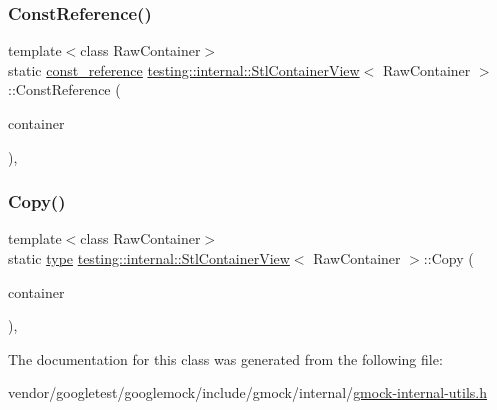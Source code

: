 \subsubsection{\texorpdfstring{Const\+Reference()}{ConstReference()}}
{\footnotesize\ttfamily template$<$class Raw\+Container$>$ \\
static \hyperlink{classtesting_1_1internal_1_1_stl_container_view_a9cd4f6ed689b3938cdb7b3c4cbf1b36b}{const\+\_\+reference} \hyperlink{classtesting_1_1internal_1_1_stl_container_view}{testing\+::internal\+::\+Stl\+Container\+View}$<$ Raw\+Container $>$\+::Const\+Reference (\begin{DoxyParamCaption}\item[{const Raw\+Container \&}]{container }\end{DoxyParamCaption})\hspace{0.3cm}{\ttfamily [inline]}, {\ttfamily [static]}}

\mbox{\label{classtesting_1_1internal_1_1_stl_container_view_a441123838221f1284873f66ed968f279}} 
\subsubsection{\texorpdfstring{Copy()}{Copy()}}
{\footnotesize\ttfamily template$<$class Raw\+Container$>$ \\
static \hyperlink{classtesting_1_1internal_1_1_stl_container_view_a2b2c63a6dcdbfe63fb0ee121ebf463ba}{type} \hyperlink{classtesting_1_1internal_1_1_stl_container_view}{testing\+::internal\+::\+Stl\+Container\+View}$<$ Raw\+Container $>$\+::Copy (\begin{DoxyParamCaption}\item[{const Raw\+Container \&}]{container }\end{DoxyParamCaption})\hspace{0.3cm}{\ttfamily [inline]}, {\ttfamily [static]}}



The documentation for this class was generated from the following file\+:\begin{DoxyCompactItemize}
\item 
vendor/googletest/googlemock/include/gmock/internal/\hyperlink{gmock-internal-utils_8h}{gmock-\/internal-\/utils.\+h}\end{DoxyCompactItemize}
